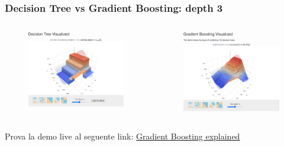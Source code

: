 \begin{frame}
	
	\frametitle{Decision Tree vs Gradient Boosting: depth 3}

	\begin{columns}
		\begin{figure}[!htbp]
			\centering
			\includegraphics[width=1.0\linewidth]{images/supervised/z_algorithms_ensemble/decision_tree_depth_3.png}
		\end{figure}
		
		\begin{figure}[!htbp]
			\centering
			\includegraphics[width=0.93\linewidth]{images/supervised/z_algorithms_ensemble/gradient_boosting_depth_3.png}
		\end{figure}
	\end{columns}
	
	\begin{center}
		Prova la demo live al seguente link: \underline{\href{http://arogozhnikov.github.io/2016/06/24/gradient_boosting_explained.html}{Gradient Boosting explained}}
	\end{center}
	
\end{frame}


